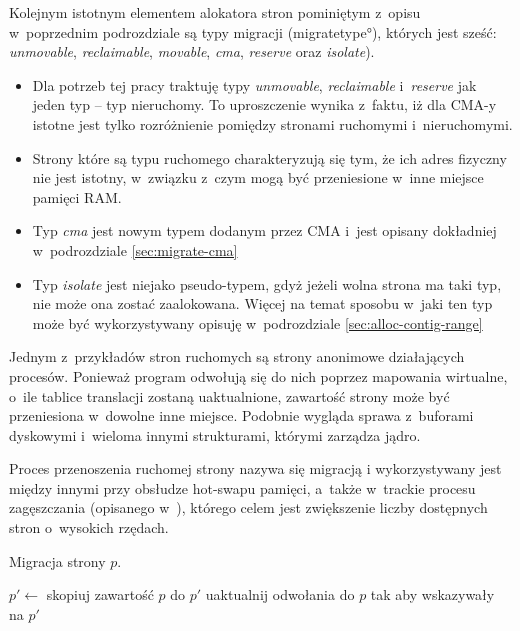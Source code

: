 Kolejnym istotnym elementem alokatora stron pominiętym z~opisu
w~poprzednim podrozdziale są typy migracji (\ang{migratetype}),
których jest sześć: {\it unmovable}, {\it reclaimable}, {\it movable},
{\it cma}, {\it reserve} oraz {\it isolate}).

\begin{itemize}
\item Dla potrzeb tej pracy traktuję typy {\it unmovable}, {\it
  reclaimable} i~{\it reserve} jak jeden typ -- typ nieruchomy.  To
  uproszczenie wynika z~faktu, iż dla CMA-y istotne jest tylko
  rozróżnienie pomiędzy stronami ruchomymi i~nieruchomymi.
\item Strony które są typu ruchomego charakteryzują się tym, że ich
  adres fizyczny nie jest istotny, w~związku z~czym mogą być
  przeniesione w~inne miejsce pamięci RAM.
\item Typ {\it cma} jest nowym typem dodanym przez CMA i~jest opisany
  dokładniej w~podrozdziale \ref{sec:migrate-cma}
\item Typ {\it isolate} jest niejako pseudo-typem, gdyż jeżeli wolna
  strona ma taki typ, nie może ona zostać zaalokowana.  Więcej na
  temat sposobu w~jaki ten typ może być wykorzystywany opisuję
  w~podrozdziale \ref{sec:alloc-contig-range}
\end{itemize}

Jednym z~przykładów stron ruchomych są strony anonimowe działających
procesów.  Ponieważ program odwołują się do nich poprzez mapowania
wirtualne, o~ile tablice translacji zostaną uaktualnione, zawartość
strony może być przeniesiona w~dowolne inne miejsce.  Podobnie wygląda
sprawa z~buforami dyskowymi i~wieloma innymi strukturami, którymi
zarządza jądro.

Proces przenoszenia ruchomej strony nazywa się migracją
i wykorzystywany jest między innymi przy obsłudze hot-swapu pamięci,
a~także w~trackie procesu zagęszczania (opisanego
w~\cite{bib:compaction}), którego celem jest zwiększenie liczby
dostępnych stron o~wysokich rzędach.

\begin{algorithm}
\caption[Migracja strony.]{Migracja strony $p$.}
\label{alg:migrate}
\begin{algorithmic}[1]
    \State $p' \gets$ 
    \State skopiuj zawartość $p$ do $p'$
    \State uaktualnij odwołania do $p$ tak aby wskazywały na $p'$
    \State {}
\EndProcedure
\end{algorithmic}
\end{algorithm}

